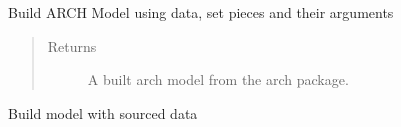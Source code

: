 \documentclass[letterpaper,10pt,english]{sphinxmanual}
\begin{document}
\begin{fulllineitems}
\begin{fulllineitems}
\end{fulllineitems}


\begin{fulllineitems}
\label{\detokenize{dalio.pipe:dalio.pipe.MakeARCH.build_model}}
Build ARCH Model using data, set pieces and their arguments
\begin{quote}\begin{description}
\item[{Returns}] \leavevmode
A built arch model from the arch package.

\end{description}\end{quote}

\end{fulllineitems}


\begin{fulllineitems}
\label{\detokenize{dalio.pipe:dalio.pipe.MakeARCH.transform}}
Build model with sourced data

\end{fulllineitems}


\end{fulllineitems}

\end{document}
